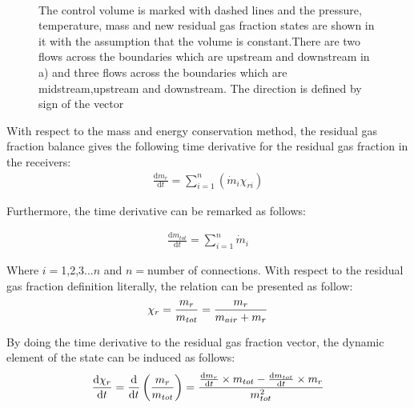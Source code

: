 \begin{figure}[tbp]
  \centering
  \qquad
  \\
  \caption{\label{fig:times}%
  The control volume is marked with dashed lines and the pressure, temperature, mass and new residual gas fraction states are shown in it with the assumption that the volume is constant.There are two flows across the boundaries which are upstream and downstream in a) and three flows across the boundaries which are midstream,upstream and downstream. The direction is defined by sign of the vector}
\end{figure}

With respect to the mass and energy conservation method, the residual gas fraction balance gives the following time derivative for the residual gas fraction in the receivers:
\begin{align}
\frac{\mathrm d m_r}{\mathrm d t}=\displaystyle\sum_{i=1}^{n} {(\dot{m}_i\chi_{ri})}
\end{align}

Furthermore, the time derivative can be remarked as follows:

\begin{align}
\frac{\mathrm d m_{tot}}{\mathrm d t}=\displaystyle\sum_{i=1}^{n} {\dot{m}_i} 
\end{align}

Where $i=$1,2,3...$n$ and $n=$number of connections.
With respect to the residual gas fraction definition literally, the relation can be presented as follow:
\begin{align}
\chi_r={m_r \over m_{tot}}={m_r \over {m_{air}+m_r}}
\end{align}

By doing the time derivative to the residual gas fraction vector, the dynamic element of the state can be induced as follows:
\begin{align}
\frac{\mathrm d \chi_r}{\mathrm d t}=\frac{\mathrm d}{\mathrm d t} \left( m_r \over m_{tot} \right)={{\frac{\mathrm d m_r}{\mathrm d t} \times m_{tot}-\frac{\mathrm d m_{tot}}{\mathrm d t} \times m_r} \over m_{tot}^2}
\end{align}


